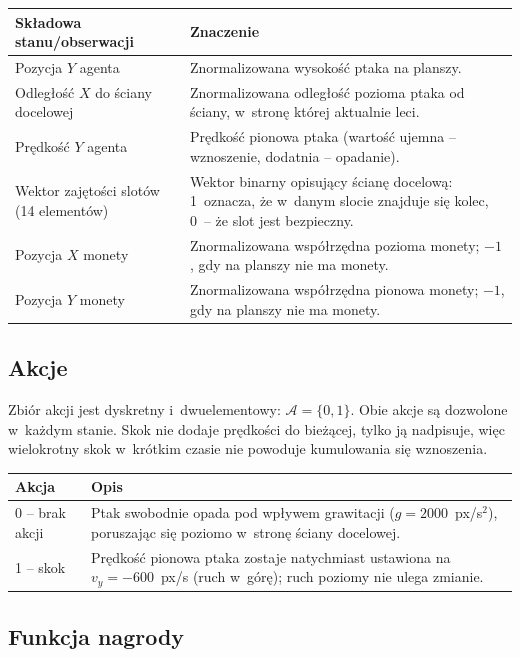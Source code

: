 \documentclass[12pt]{article}
\begin{document}
\begin{center}
\begin{tabular}{p{}p{}}
\toprule
Składowa stanu/obserwacji & Znaczenie \\
\midrule
Pozycja $Y$ agenta & Znormalizowana wysokość ptaka na planszy. \\
Odległość $X$ do ściany docelowej & Znormalizowana odległość pozioma ptaka
od ściany, w~stronę której aktualnie leci. \\
Prędkość $Y$ agenta & Prędkość pionowa ptaka (wartość ujemna -- wznoszenie,
dodatnia -- opadanie). \\
Wektor zajętości slotów (14 elementów) &
Wektor binarny opisujący ścianę docelową: 1~oznacza, że w~danym slocie
znajduje się kolec, 0~-- że slot jest bezpieczny. \\
Pozycja $X$ monety & Znormalizowana współrzędna pozioma monety;
$-1$, gdy na planszy nie ma monety. \\
Pozycja $Y$ monety & Znormalizowana współrzędna pionowa monety;
$-1$, gdy na planszy nie ma monety. \\
\bottomrule
\end{tabular}
\end{center}

\subsection{Akcje}

Zbiór akcji jest dyskretny i~dwuelementowy: $\mathcal{A} = \{0, 1\}$.
Obie akcje są dozwolone w~każdym stanie. Skok nie dodaje prędkości do
bieżącej, tylko ją nadpisuje, więc wielokrotny skok w~krótkim czasie nie
powoduje kumulowania się wznoszenia.
 
\begin{center}
\begin{tabular}{p{}p{}}
\toprule
Akcja & Opis \\
\midrule
0 -- brak akcji & Ptak swobodnie opada pod wpływem grawitacji
($g = 2000$~px/s$^2$), poruszając się poziomo w~stronę ściany docelowej. \\
1 -- skok & Prędkość pionowa ptaka zostaje natychmiast ustawiona na
$v_y = -600$~px/s (ruch w~górę); ruch poziomy nie ulega zmianie. \\
\bottomrule
\end{tabular}
\end{center}
 

\subsection{Funkcja nagrody}
\end{document}
